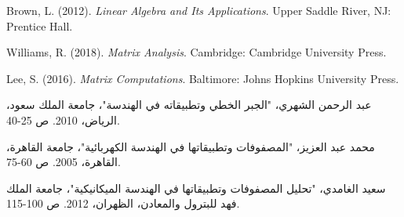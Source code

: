 \documentclass{arabicClass}
\begin{document}
	\abovedisplayskip=7pt
	\belowdisplayskip=7pt
	
	
	
	\tableofcontents
	\clearpage
	
	
	
	
	
	
	
\begin{thebibliography}{9}
\begin{english}
	Brown, L. (2012). \textit{Linear Algebra and Its Applications}. Upper Saddle River, NJ: Prentice Hall.
	
	Williams, R. (2018). \textit{Matrix Analysis}. Cambridge: Cambridge University Press.
	
	Lee, S. (2016). \textit{Matrix Computations}. Baltimore: Johns Hopkins University Press.
\end{english}
	
	عبد الرحمن الشهري، "الجبر الخطي وتطبيقاته في الهندسة"، جامعة الملك سعود، الرياض، 2010. ص 25-40.
	
	محمد عبد العزيز، "المصفوفات وتطبيقاتها في الهندسة الكهربائية"، جامعة القاهرة، القاهرة، 2005. ص 60-75.
	
	سعيد الغامدي، "تحليل المصفوفات وتطبيقاتها في الهندسة الميكانيكية"، جامعة الملك فهد للبترول والمعادن، الظهران، 2012. ص 100-115.
	
\end{thebibliography}
\end{document}
